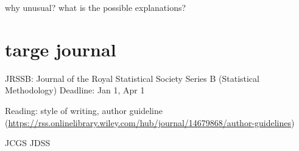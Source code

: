 \documentclass[]{interact}
\theoremstyle{plain}%
\theoremstyle{definition}
\theoremstyle{remark}
\begin{document}
why unusual? what is the possible explanations?

\hypertarget{targe-journal}{%
\section{targe journal}\label{targe-journal}}

JRSSB: Journal of the Royal Statistical Society Series B (Statistical
Methodology) Deadline: Jan 1, Apr 1

Reading: style of writing, author guideline
(\url{https://rss.onlinelibrary.wiley.com/hub/journal/14679868/author-guidelines})

JCGS JDSS



\end{document}
